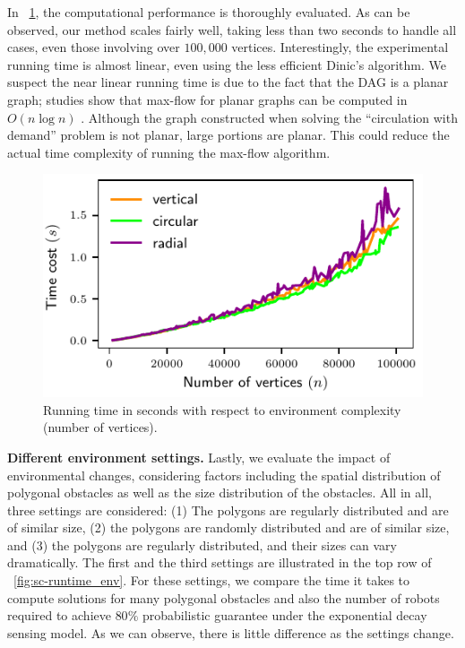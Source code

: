 In ~\ref{fig:sc-simulations_runtime}, the computational performance is thoroughly 
evaluated. As can be observed, our method scales fairly well, taking less than two seconds
to handle all cases, even those involving over $100,000$ vertices. 
%
Interestingly, the experimental running time is almost linear, even using the less efficient Dinic's algorithm. 
%
We suspect the near linear running time is due to the fact that the DAG is 
a planar graph; studies show that max-flow for planar graphs can be computed 
in $O(n\log n)$ \cite{borradaile2009n}. 
%
Although the graph constructed when solving the ``circulation with demand'' problem is not planar, large portions are planar. 
This could reduce the actual time complexity of running the max-flow algorithm.

\begin{figure}[h]
\vspace{2mm}
    \centering
    \includegraphics[width=0.5\linewidth]{chapters/sc/fig/runtime-eps-converted-to.pdf}
    \caption{Running time in seconds with respect to environment complexity (number of vertices). }
    \label{fig:sc-simulations_runtime}
\end{figure}

\textbf{Different environment settings.}
Lastly, we evaluate the impact of environmental changes, considering factors including the spatial distribution of polygonal obstacles as well as 
the size distribution of the obstacles. 
%
All in all, three settings are considered: (1) The polygons are regularly distributed 
and are of similar size, (2) the polygons are randomly distributed and are of similar size,
and (3) the polygons are regularly distributed, and their sizes can vary dramatically. 
The first and the third settings are illustrated in the top row of ~\ref{fig:sc-runtime_env}.
%
For these settings, we compare the time it takes to compute solutions for many polygonal
obstacles and also the number of robots required to achieve $80\%$ probabilistic guarantee 
under the exponential decay sensing model.
%
As we can observe, there is little difference as the settings change. 


